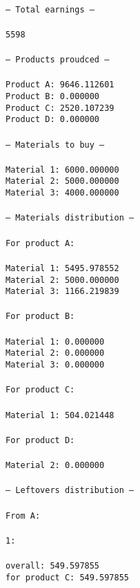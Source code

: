 \documentclass[12pt, a4paper]{article}
\begin{document}
\texttt{
\\
--- Total earnings ---\\\\
5598\\\\
--- Products proudced ---\\\\
Product A: 9646.112601\\
Product B: 0.000000\\
Product C: 2520.107239\\
Product D: 0.000000\\\\
--- Materials to buy ---\\\\
Material 1: 6000.000000\\
Material 2: 5000.000000\\
Material 3: 4000.000000\\\\
--- Materials distribution ---\\\\
For product A:\\\\
  Material 1: 5495.978552\\
  Material 2: 5000.000000\\
  Material 3: 1166.219839\\\\
For product B:\\\\
  Material 1: 0.000000\\
  Material 2: 0.000000\\
  Material 3: 0.000000\\\\
For product C:\\\\
  Material 1: 504.021448\\\\
For product D:\\\\
  Material 2: 0.000000\\\\
--- Leftovers distribution ---\\\\
From A:\\\\
  1:\\\\
     overall:       549.597855\\
     for product C: 549.597855\\
}
\end{document}
